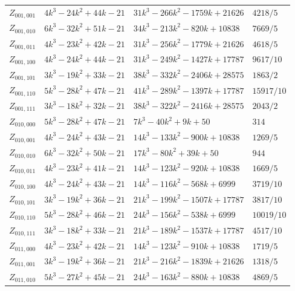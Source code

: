 \documentclass[11pt]{amsart}
\theoremstyle{definition}
\theoremstyle{remark}
\newcommand{\1}{\mathbf 1}
\begin{document}
{\begin{longtable}{@{}llll@{}}
$Z_{001,001}$ & $4 k^{3} - 24 k^{2} + 44 k - 21$ & $31 k^{3} - 266 k^{2} - 1759 k + 21626$ & $4218 / 5$\\
$Z_{001,010}$ & $6 k^{3} - 32 k^{2} + 51 k - 21$ & $34 k^{3} - 213 k^{2} - 820 k + 10838$ & $7669 / 5$\\
$Z_{001,011}$ & $4 k^{3} - 23 k^{2} + 42 k - 21$ & $31 k^{3} - 256 k^{2} - 1779 k + 21626$ & $4618 / 5$\\
$Z_{001,100}$ & $4 k^{3} - 24 k^{2} + 44 k - 21$ & $31 k^{3} - 249 k^{2} - 1427 k + 17787$ & $9617 / 10$\\
$Z_{001,101}$ & $3 k^{3} - 19 k^{2} + 33 k - 21$ & $38 k^{3} - 332 k^{2} - 2406 k + 28575$ & $1863 / 2$\\
$Z_{001,110}$ & $5 k^{3} - 28 k^{2} + 47 k - 21$ & $41 k^{3} - 289 k^{2} - 1397 k + 17787$ & $15917 / 10$\\
$Z_{001,111}$ & $3 k^{3} - 18 k^{2} + 32 k - 21$ & $38 k^{3} - 322 k^{2} - 2416 k + 28575$ & $2043 / 2$\\
$Z_{010,000}$ & $5 k^{3} - 28 k^{2} + 47 k - 21$ & $7 k^{3} - 40 k^{2} + 9 k + 50$ & $314$\\
$Z_{010,001}$ & $4 k^{3} - 24 k^{2} + 43 k - 21$ & $14 k^{3} - 133 k^{2} - 900 k + 10838$ & $1269 / 5$\\
$Z_{010,010}$ & $6 k^{3} - 32 k^{2} + 50 k - 21$ & $17 k^{3} - 80 k^{2} + 39 k + 50$ & $944$\\
$Z_{010,011}$ & $4 k^{3} - 23 k^{2} + 41 k - 21$ & $14 k^{3} - 123 k^{2} - 920 k + 10838$ & $1669 / 5$\\
$Z_{010,100}$ & $4 k^{3} - 24 k^{2} + 43 k - 21$ & $14 k^{3} - 116 k^{2} - 568 k + 6999$ & $3719 / 10$\\
$Z_{010,101}$ & $3 k^{3} - 19 k^{2} + 36 k - 21$ & $21 k^{3} - 199 k^{2} - 1507 k + 17787$ & $3817 / 10$\\
$Z_{010,110}$ & $5 k^{3} - 28 k^{2} + 46 k - 21$ & $24 k^{3} - 156 k^{2} - 538 k + 6999$ & $10019 / 10$\\
$Z_{010,111}$ & $3 k^{3} - 18 k^{2} + 33 k - 21$ & $21 k^{3} - 189 k^{2} - 1537 k + 17787$ & $4517 / 10$\\
$Z_{011,000}$ & $4 k^{3} - 23 k^{2} + 42 k - 21$ & $14 k^{3} - 123 k^{2} - 910 k + 10838$ & $1719 / 5$\\
$Z_{011,001}$ & $3 k^{3} - 19 k^{2} + 36 k - 21$ & $21 k^{3} - 216 k^{2} - 1839 k + 21626$ & $1318 / 5$\\
$Z_{011,010}$ & $5 k^{3} - 27 k^{2} + 45 k - 21$ & $24 k^{3} - 163 k^{2} - 880 k + 10838$ & $4869 / 5$\\

\end{longtable}}
\end{document}

